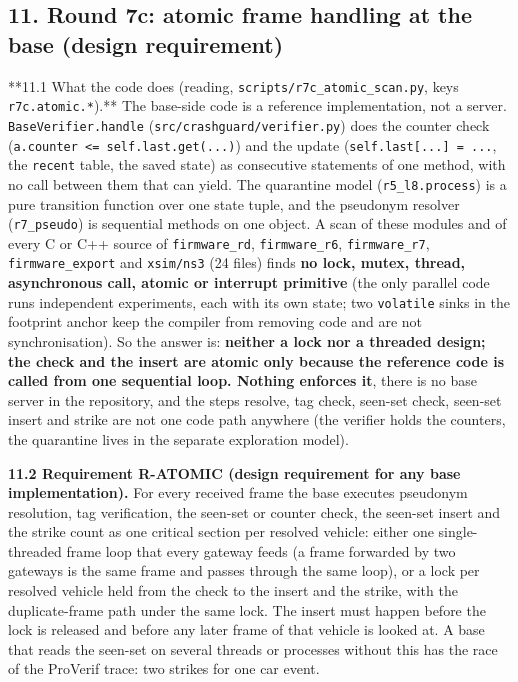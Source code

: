 \subsection*{11. Round 7c: atomic frame handling at the base (design requirement)}

**11.1 What the code does (reading, \texttt{scripts/r7c\_atomic\_scan.py}, keys \texttt{r7c.atomic.*}).** The base-side code is a reference implementation, not a server. \texttt{BaseVerifier.handle} (\texttt{src/crashguard/verifier.py}) does the counter check (\texttt{a.counter <= self.last.get(...)}) and the update (\texttt{self.last[...] = ...}, the \texttt{recent} table, the saved state) as consecutive statements of one method, with no call between them that can yield. The quarantine model (\texttt{r5\_l8.process}) is a pure transition function over one state tuple, and the pseudonym resolver (\texttt{r7\_pseudo}) is sequential methods on one object. A scan of these modules and of every C or C++ source of \texttt{firmware\_rd}, \texttt{firmware\_r6}, \texttt{firmware\_r7}, \texttt{firmware\_export} and \texttt{xsim/ns3} (24 files) finds \textbf{no lock, mutex, thread, asynchronous call, atomic or interrupt primitive} (the only parallel code runs independent experiments, each with its own state; two \texttt{volatile} sinks in the footprint anchor keep the compiler from removing code and are not synchronisation). So the answer is: \textbf{neither a lock nor a threaded design; the check and the insert are atomic only because the reference code is called from one sequential loop. Nothing enforces it}, there is no base server in the repository, and the steps resolve, tag check, seen-set check, seen-set insert and strike are not one code path anywhere (the verifier holds the counters, the quarantine lives in the separate exploration model).

\textbf{11.2 Requirement R-ATOMIC (design requirement for any base implementation).} For every received frame the base executes pseudonym resolution, tag verification, the seen-set or counter check, the seen-set insert and the strike count as one critical section per resolved vehicle: either one single-threaded frame loop that every gateway feeds (a frame forwarded by two gateways is the same frame and passes through the same loop), or a lock per resolved vehicle held from the check to the insert and the strike, with the duplicate-frame path under the same lock. The insert must happen before the lock is released and before any later frame of that vehicle is looked at. A base that reads the seen-set on several threads or processes without this has the race of the ProVerif trace: two strikes for one car event.

